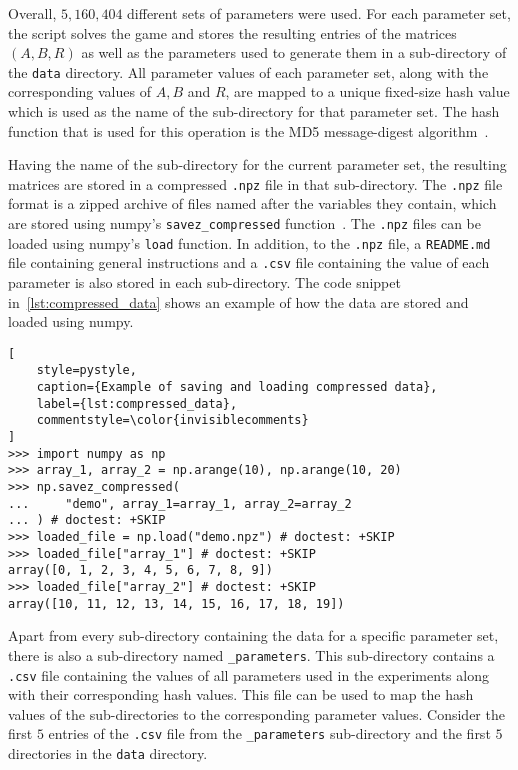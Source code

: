 Overall, \(5,\!160,\!404\) different sets of parameters were used.
For each parameter set, the script solves the game and stores the resulting
entries of the matrices \((A, B, R)\) as well as the parameters used to generate
them in a sub-directory of the \texttt{data} directory.
All parameter values of each parameter set, along with the corresponding values
of \(A, B\) and \(R\), are mapped to a unique fixed-size hash value which is
used as the name of the sub-directory for that parameter set.
The hash function that is used for this operation is the MD5 message-digest
algorithm~\cite{rivest1992md5}.

Having the name of the sub-directory for the current parameter set, the
resulting matrices are stored in a compressed \texttt{.npz} file in that
sub-directory.
The \texttt{.npz} file format is a zipped archive of files
named after the variables they contain, which are stored using numpy's
\texttt{savez\_compressed} function~\cite{2020NumPy-Array}.
The \texttt{.npz} files can be loaded using numpy's
\texttt{load} function.
In addition, to the \texttt{.npz} file, a
\texttt{README.md} file containing general instructions and a
\texttt{.csv} file containing the value of each parameter is
also stored in each sub-directory.
The code snippet in~\ref{lst:compressed_data} shows an example of how the data
are stored and loaded using numpy.

\newpage

\begin{lstlisting}[
    style=pystyle,
    caption={Example of saving and loading compressed data},
    label={lst:compressed_data},
    commentstyle=\color{invisiblecomments}
]
>>> import numpy as np
>>> array_1, array_2 = np.arange(10), np.arange(10, 20)
>>> np.savez_compressed(
...     "demo", array_1=array_1, array_2=array_2
... ) # doctest: +SKIP
>>> loaded_file = np.load("demo.npz") # doctest: +SKIP
>>> loaded_file["array_1"] # doctest: +SKIP
array([0, 1, 2, 3, 4, 5, 6, 7, 8, 9])
>>> loaded_file["array_2"] # doctest: +SKIP
array([10, 11, 12, 13, 14, 15, 16, 17, 18, 19])

\end{lstlisting}

Apart from every sub-directory containing the data for a specific parameter set,
there is also a sub-directory named \texttt{\_parameters}.
This sub-directory contains a \texttt{.csv} file containing the
values of all parameters used in the experiments along with their corresponding
hash values.
This file can be used to map the hash values of the sub-directories to the
corresponding parameter values.
Consider the first \(5\) entries of the \texttt{.csv} file
from the \texttt{\_parameters} sub-directory and the first
\(5\) directories in the \texttt{data} directory.

